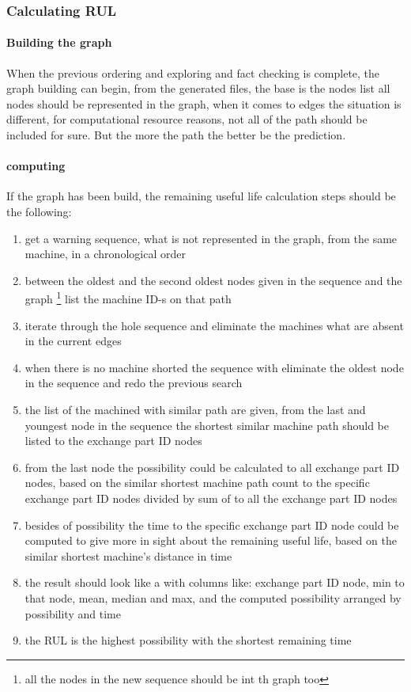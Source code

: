 		\subsubsection{Calculating RUL}
			\paragraph{Building the graph}
			When the previous ordering and exploring and fact checking is complete, the graph building can begin, from the generated files, the base is the nodes list all nodes should be represented in the graph, when it comes to edges the situation is different, for computational resource reasons, not all of the path should be included for sure. But the more the path the better be the prediction.
			\paragraph{computing}
			If the graph has been build, the remaining useful life calculation steps should be the following:
			\begin{enumerate}
				\item{get a warning sequence, what is not represented in the graph, from the same machine, in a chronological order}
				\item{between the oldest and the second oldest nodes given in the sequence and the graph \footnote{all the nodes in the new sequence should be int th graph too} list the machine ID-s on that path}
				\item{iterate through the hole sequence and eliminate the machines what are absent in the current edges}
				\item{when there is no machine shorted the sequence with eliminate the oldest node in the sequence and redo the previous search}
				\item{the list of the machined with similar path are given, from the last and youngest node in the sequence the shortest similar machine path should be listed to the exchange part ID nodes}
				\item{from the last node the possibility could be calculated to all exchange part ID nodes, based on the similar shortest machine path count to the specific exchange part ID nodes divided by sum of to all the exchange part ID nodes}
				\item{besides of possibility the time to the specific exchange part ID node could be computed to give more in sight about the remaining useful life, based on the similar shortest machine's distance in time}
				\item{the result should look like a with columns like: exchange part ID node, min to that node, mean, median and max, and the computed possibility arranged by possibility and time} 
		 		\item{the RUL is the highest possibility with the shortest remaining time}
		 	\end{enumerate}
			
